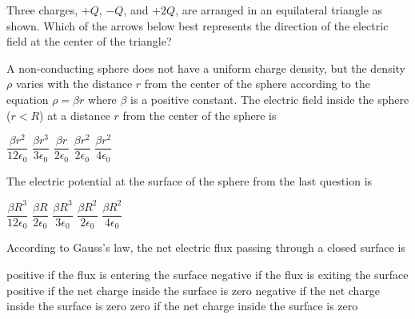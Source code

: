 \documentclass{../../../oss-classkick-exam}
\begin{document}
\begin{multicols*}{2}
\begin{questions}
   \question Three charges, $+Q$, $-Q$, and $+2Q$, are arranged in an
   equilateral triangle as shown. Which of the arrows below best represents the
   direction of the electric field at the center of the triangle?
   \begin{center}
     \vspace{-.1in}
   \end{center}
   \begin{choices}
     \choice {\Huge$\downarrow$}
     \choice {\Huge$\uparrow$}
     \choice {\Huge$\searrow$}
     \choice {\Huge$\swarrow$}
     \choice {\Huge$\nearrow$}
   \end{choices}
 
   \question A non-conducting sphere does not have a uniform charge density,
   but the density $\rho$ varies with the distance $r$ from the center of the
   sphere according to the equation $\rho=\beta r$ where $\beta$ is a positive
   constant. The electric field inside the sphere ($r<R$) at a distance $r$
   from the center of the sphere is
   \begin{choices}
     \choice $\dfrac{\beta r^2}{12\epsilon_0}$
     \choice $\dfrac{\beta r^3}{3\epsilon_0}$
     \choice $\dfrac{\beta r}{2\epsilon_0}$
     \choice $\dfrac{\beta r^2}{2\epsilon_0}$
     \choice $\dfrac{\beta r^2}{4\epsilon_0}$
   \end{choices}
 
   \question The electric potential at the surface of the sphere from the last
   question is
   \begin{choices}
     \choice $\dfrac{\beta R^3}{12\epsilon_0}$
     \choice $\dfrac{\beta R}{2\epsilon_0}$
     \choice $\dfrac{\beta R^3}{3\epsilon_0}$
     \choice $\dfrac{\beta R^2}{2\epsilon_0}$
     \choice $\dfrac{\beta R^2}{4\epsilon_0}$
   \end{choices}
   
   \question According to Gauss's law, the net electric flux passing through a
   closed surface is
   \begin{choices}
     \choice positive if the flux is entering the surface
     \choice negative if the flux is exiting the surface
     \choice positive if the net charge inside the surface is zero
     \choice negative if the net charge inside the surface is zero
     \choice zero if the net charge inside the surface is zero
   \end{choices}
   \vspace{.7in}
   

\end{questions}
\end{multicols*}
\end{document}
